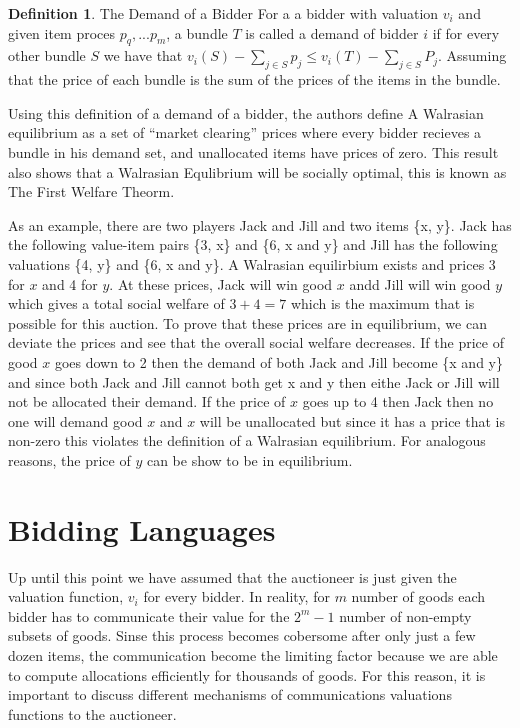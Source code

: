 \documentclass[10pt,onecolumn,letterpaper]{article}
\theoremstyle{definition}
\newtheorem{definition}{Definition}[section]
\begin{document}
\theoremstyle{definition}
\begin{definition}{The Demand of a Bidder} For a a bidder with valuation $v_i$ and given item proces $p_q,...p_m$, a bundle $T$ is called a demand of bidder $i$ if for every other bundle $S$ we have that $v_i(S) - \sum_{j \in S} p_j \leq v_i(T) - \sum_{j \in S} P_j$. Assuming that the price of each bundle is the sum of the prices of the items in the bundle.
\end{definition}

Using this definition of a demand of a bidder, the authors define A Walrasian equilibrium as a set of ``market clearing'' prices where every bidder recieves a bundle in his demand set, and unallocated items have prices of zero. This result also shows that a Walrasian Equlibrium will be socially optimal, this is known as The First Welfare Theorm. 

As an example, there are two players Jack and Jill and two items \{x, y\}. Jack has the following value-item pairs \{3, x\} and \{6, x and y\} and Jill has the following valuations \{4, y\} and \{6, x and y\}. A Walrasian equilirbium exists and prices 3 for $x$ and 4 for $y$. At these prices, Jack will win good $x$ andd Jill will win good $y$ which gives a total social welfare of $3 + 4 = 7$ which is the maximum that is possible for this auction. To prove that these prices are in equilibrium, we can deviate the prices and see that the overall social welfare decreases. If the price of good $x$ goes down to 2 then the demand of both Jack and Jill become \{x and y\} and since both Jack and Jill cannot both get x and y then eithe Jack or Jill will not be allocated their demand. If the price of $x$ goes up to 4 then Jack then no one will demand good $x$ and $x$ will be unallocated but since it has a price that is non-zero this violates the definition of a Walrasian equilibrium. For analogous reasons, the price of $y$ can be show to be in equilibrium. 

\section{Bidding Languages} %

Up until this point we have assumed that the auctioneer is just given the valuation function, $v_i$ for every bidder. In reality, for $m$ number of goods each bidder has to communicate their value for the $2^m - 1$ number of non-empty subsets of goods. Sinse this process becomes cobersome after only just a few dozen items, the communication become the limiting factor because we are able to compute allocations efficiently for thousands of goods. For this reason, it is important to discuss different mechanisms of communications valuations functions to the auctioneer. 
\end{document}
